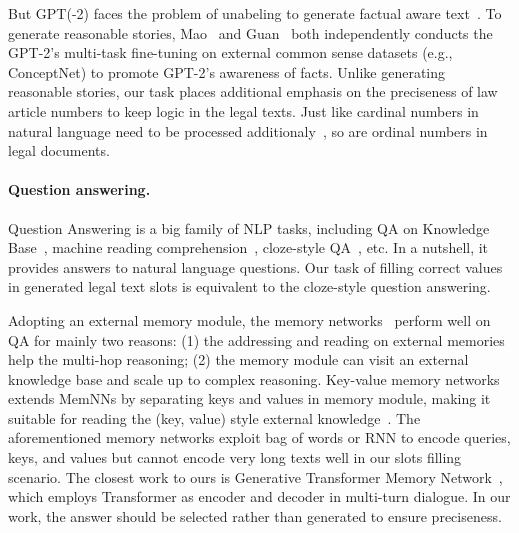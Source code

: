 \documentclass{article}
\begin{document}
But GPT(-2) faces the problem of unabeling to generate factual aware text~\cite{logan2019kglm,mao2019improving,guan2020tacl_commensense}.
To generate reasonable stories, Mao~ and Guan~ both independently conducts the GPT-2's multi-task fine-tuning on external common sense datasets (e.g., ConceptNet) to promote GPT-2's awareness of facts. 
Unlike generating reasonable stories, our task places additional emphasis on the preciseness of law article numbers to keep logic in the legal texts.
Just like cardinal numbers in natural language need to be processed additionaly~\cite{andor-etal-2019-bertcalculator}, so are ordinal numbers in legal documents.

\paragraph{Question answering.} Question Answering is a big family of NLP tasks, including QA on Knowledge Base~\cite{berant-etal-2013-qa-onfreebase}, machine reading comprehension~\cite{rajpurkar-etal-2016-squad}, cloze-style QA~\cite{das-etal-2017-textkbqa}, etc. 
In a nutshell, it provides answers to natural language questions. 
Our task of filling correct values in generated legal text slots is equivalent to the cloze-style question answering. 

Adopting an external memory module, the memory networks~\cite{weston2014memory,sukhbaatar2015end,bordes2015largememqa} perform well on QA for mainly two reasons: (1) the addressing and reading on external memories help the multi-hop reasoning; (2) the memory module can visit an external knowledge base and scale up to complex reasoning. 
Key-value memory networks~\cite{miller2016kvmemnn} extends MemNNs by separating keys and values in memory module, making it suitable for reading the (key, value) style external knowledge~\cite{das-etal-2017-textkbqa,xu2019enhancing}. 
The aforementioned memory networks exploit bag of words or RNN to encode queries, keys, and values but cannot encode very long texts well in our slots filling scenario. 
The closest work to ours is Generative Transformer Memory Network~\cite{dinan2018wizard}, which employs Transformer as encoder and decoder in multi-turn dialogue.  
In our work, the answer should be selected rather than generated to ensure preciseness. 
\end{document}

